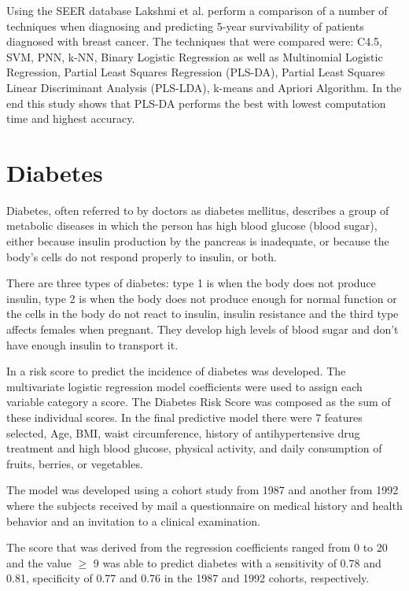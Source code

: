 Using the SEER database Lakshmi et al. perform a comparison of a number of techniques when diagnosing and predicting 5-year
 survivability of patients diagnosed with breast cancer. The techniques that were compared were: C4.5, SVM, PNN, k-NN, Binary 
 Logistic Regression as well as Multinomial Logistic Regression, Partial Least Squares Regression (PLS-DA), Partial Least Squares 
 Linear Discriminant Analysis (PLS-LDA), k-means and Apriori Algorithm. In the end this study shows that PLS-DA performs the best
 with lowest computation time and highest accuracy. \cite{Lakshmi2013}

\section{Diabetes}
\label{section:diabetes}

Diabetes, often referred to by doctors as diabetes mellitus, describes a group of metabolic diseases in which the person 
has high blood glucose (blood sugar), either because insulin production by the pancreas is inadequate, or because the body's
 cells do not respond properly to insulin, or both.

There are three types of diabetes: type 1 is when the body does not produce insulin, type 2 is when the body does not 
produce enough for normal function or the cells in the body do not react to insulin, insulin resistance and the third type 
affects females when pregnant. They develop high levels of blood sugar and don’t have enough insulin to transport it. 

In \cite{Lindstrom2003} a risk score to predict the incidence of diabetes was developed. The multivariate logistic regression model
 coefficients were used to assign each variable category a score. The Diabetes Risk Score was composed as the sum of these individual
 scores. In the final predictive model there were 7 features selected, Age, BMI, waist circumference, history of antihypertensive
 drug treatment and high blood glucose, physical activity, and daily consumption of fruits, berries, or vegetables. 

The model was developed using a cohort study from 1987 and another from 1992 where the subjects received by mail a questionnaire 
on medical history and health behavior and an invitation to a clinical examination.

The score that was derived from the regression coefficients ranged from 0 to 20 and the value $\geq$ 9 was able to predict diabetes
 with a sensitivity of 0.78 and 0.81, specificity of 0.77 and 0.76 in the 1987 and 1992 cohorts, respectively.


